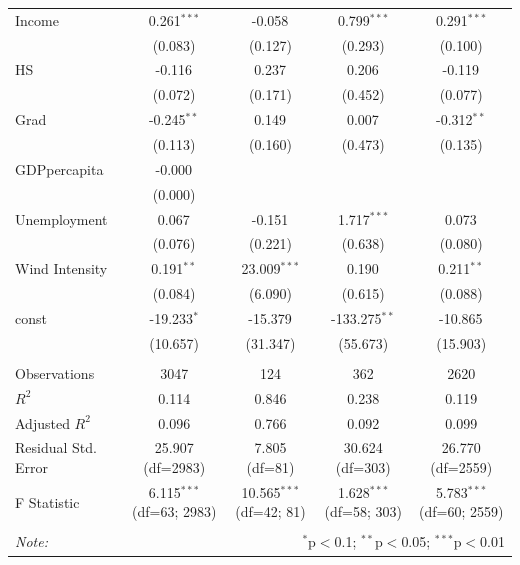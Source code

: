 \begin{table}[!htbp]
\begin{tabular}{@{\extracolsep{5pt}}lcccc}
 Income & 0.261$^{***}$ & -0.058$^{}$ & 0.799$^{***}$ & 0.291$^{***}$ \\
& (0.083) & (0.127) & (0.293) & (0.100) \\
 HS & -0.116$^{}$ & 0.237$^{}$ & 0.206$^{}$ & -0.119$^{}$ \\
& (0.072) & (0.171) & (0.452) & (0.077) \\
 Grad & -0.245$^{**}$ & 0.149$^{}$ & 0.007$^{}$ & -0.312$^{**}$ \\
& (0.113) & (0.160) & (0.473) & (0.135) \\
 GDPpercapita & -0.000$^{}$ & & & \\
& (0.000) & & & \\
 Unemployment & 0.067$^{}$ & -0.151$^{}$ & 1.717$^{***}$ & 0.073$^{}$ \\
& (0.076) & (0.221) & (0.638) & (0.080) \\
 Wind Intensity & 0.191$^{**}$ & 23.009$^{***}$ & 0.190$^{}$ & 0.211$^{**}$ \\
& (0.084) & (6.090) & (0.615) & (0.088) \\
 const & -19.233$^{*}$ & -15.379$^{}$ & -133.275$^{**}$ & -10.865$^{}$ \\
& (10.657) & (31.347) & (55.673) & (15.903) \\
\hline \\[-1.8ex]
 Observations & 3047 & 124 & 362 & 2620 \\
 $R^2$ & 0.114 & 0.846 & 0.238 & 0.119 \\
 Adjusted $R^2$ & 0.096 & 0.766 & 0.092 & 0.099 \\
 Residual Std. Error & 25.907 (df=2983) & 7.805 (df=81) & 30.624 (df=303) & 26.770 (df=2559) \\
 F Statistic & 6.115$^{***}$ (df=63; 2983) & 10.565$^{***}$ (df=42; 81) & 1.628$^{***}$ (df=58; 303) & 5.783$^{***}$ (df=60; 2559) \\
\hline
\hline \\[-1.8ex]
\textit{Note:} & \multicolumn{4}{r}{$^{*}$p$<$0.1; $^{**}$p$<$0.05; $^{***}$p$<$0.01} \\
\end{tabular}
\end{table}